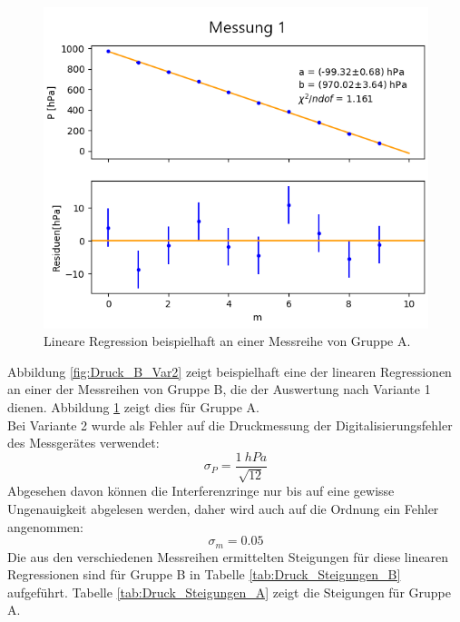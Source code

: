 \documentclass[12pt,a4paper]{article}
\begin{document}
\begin{figure}
\centering
\includegraphics[scale=0.8]{Bilder/Druck_A_Var2_1.png}
\caption{Lineare Regression beispielhaft an einer Messreihe von Gruppe A.}
\label{fig:Druck_A_Var2}
\end{figure}

Abbildung \ref{fig:Druck_B_Var2} zeigt beispielhaft eine der linearen Regressionen an einer der Messreihen von Gruppe B, die der Auswertung nach Variante 1 dienen. Abbildung \ref{fig:Druck_A_Var2} zeigt dies für Gruppe A. \\
Bei Variante 2 wurde als Fehler auf die Druckmessung der Digitalisierungsfehler des Messgerätes verwendet:
\begin{equation*}
\sigma _P = \dfrac{\SI{1}{hPa}}{\sqrt{12}}
\end{equation*}
Abgesehen davon können die Interferenzringe nur bis auf eine gewisse Ungenauigkeit abgelesen werden, daher wird auch auf die Ordnung ein Fehler angenommen:
\begin{equation*}
\sigma _m = 0.05
\end{equation*}
Die aus den verschiedenen Messreihen ermittelten Steigungen für diese linearen Regressionen sind für Gruppe B in Tabelle \ref{tab:Druck_Steigungen_B} aufgeführt. Tabelle \ref{tab:Druck_Steigungen_A} zeigt die Steigungen für Gruppe A.
\end{document}
